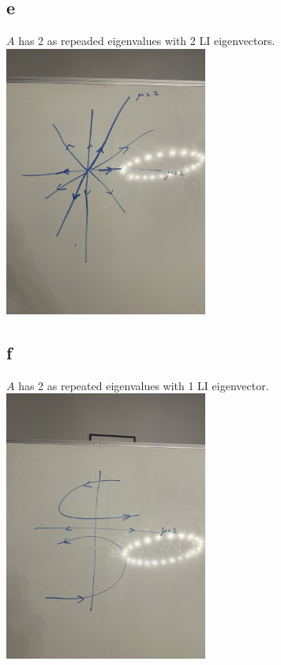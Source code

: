 \documentclass{article}
\begin{document}
\subsection*{e}
$A$ has 2 as repeaded eigenvalues with 2 LI eigenvectors.\\
\includegraphics[width=0.5\textwidth]{IMG_2800.jpg}
\subsection*{f}
$A$ has 2 as repeated eigenvalues with 1 LI eigenvector.\\
\includegraphics[width=0.5\textwidth]{IMG_2801.jpg}
\end{document}
